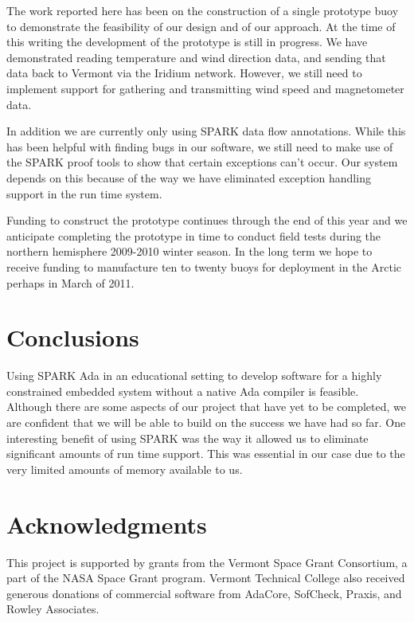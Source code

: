 \documentclass{sig-alternate}
\begin{document}
The work reported here has been on the construction of a single prototype buoy to demonstrate
the feasibility of our design and of our approach. At the time of this writing the development
of the prototype is still in progress. We have demonstrated reading temperature and wind
direction data, and sending that data back to Vermont via the Iridium network. However, we still
need to implement support for gathering and transmitting wind speed and magnetometer data.

In addition we are currently only using SPARK data flow annotations. While this has been helpful
with finding bugs in our software, we still need to make use of the SPARK proof tools to show
that certain exceptions can't occur. Our system depends on this because of the way we have
eliminated exception handling support in the run time system.

Funding to construct the prototype continues through the end of this year and we anticipate
completing the prototype in time to conduct field tests during the northern hemisphere 2009-2010
winter season. In the long term we hope to receive funding to manufacture ten to twenty buoys
for deployment in the Arctic perhaps in March of 2011.

\section{Conclusions}

Using SPARK Ada in an educational setting to develop software for a highly constrained embedded
system without a native Ada compiler is feasible. Although there are some aspects of our project
that have yet to be completed, we are confident that we will be able to build on the success we
have had so far. One interesting benefit of using SPARK was the way it allowed us to
eliminate significant amounts of run time support. This was essential in our case due to the
very limited amounts of memory available to us.

\vfill\eject
\section{Acknowledgments}

This project is supported by grants from the Vermont Space Grant Consortium, a part of the NASA
Space Grant program. Vermont Technical College also received generous donations of commercial
software from AdaCore, SofCheck, Praxis, and Rowley Associates.
\end{document}
